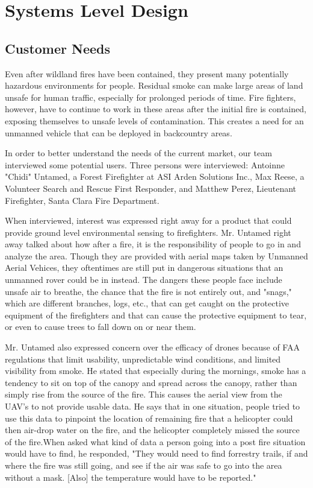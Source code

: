 \chapter{Systems Level Design}
\graphicspath{{images/}}
%
\section{Customer Needs }
Even after wildland fires have been contained, they present many potentially hazardous environments for people. Residual smoke can make large areas of land unsafe for human traffic, especially for prolonged periods of time. Fire fighters, however, have to continue to work in these areas after the initial fire is contained, exposing themselves to unsafe levels of contamination. This creates a need for an unmanned vehicle that can be deployed in backcountry areas. 

In order to better understand the needs of the current market, our team interviewed some potential users. Three persons were interviewed: Antoinne "Chidi" Untamed, a Forest Firefighter at ASI Arden Solutions Inc., Max Reese, a Volunteer Search and Rescue First Responder, and Matthew Perez, Lieutenant Firefighter, Santa Clara Fire Department. 

When interviewed, interest was expressed right away for a product that could provide ground level environmental sensing to firefighters. Mr. Untamed right away talked about how after a fire, it is the responsibility of people to go in and analyze the area. Though they are provided with aerial maps taken by Unmanned Aerial Vehices, they oftentimes are still put in dangerous situations that an unmanned rover could be in instead. The dangers these people face include unsafe air to breathe, the chance that the fire is not entirely out, and "snags," which are different branches, logs, etc., that can get caught on the protective equipment of the firefighters and that can cause the protective equipment to tear, or even to cause trees to fall down on or near them. 

Mr. Untamed also expressed concern over the efficacy of drones because of FAA regulations that limit usability, unpredictable wind conditions, and limited visibility from smoke. He stated that especially during the mornings, smoke has a tendency to sit on top of the canopy and spread across the canopy, rather than simply rise from the source of the fire. This causes the aerial view from the UAV's to not provide usable data. He says that in one situation, people tried to use this data to pinpoint the location of remaining fire that a helicopter could then air-drop water on the fire, and the helicopter completely missed the source of the fire.When asked what kind of data a person going into a post fire situation would have to find, he responded, "They would need to find forrestry trails, if and where the fire was still going, and see if the air was safe to go into the area without a mask. [Also] the temperature would have to be reported." 

